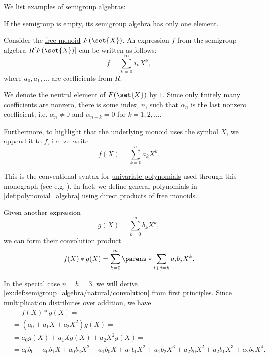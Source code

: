 \begin{example}\label{ex:def:semigroup_algebra}
  We list examples of \hyperref[def:semigroup_algebra]{semigroup algebras}:
  \begin{thmenum}
     If the semigroup is empty, its semigroup algebra has only one element.

     Consider the \hyperref[def:free_monoid]{free monoid} \( F(\set{ X }) \). An expression \( f \) from the semigroup algebra \( R[F(\set{ X })] \) can be written as follows:
    \begin{equation*}
      f = \sum_{k=0}^\infty a_k X^k,
    \end{equation*}
    where \( a_0, a_1, \ldots \) are coefficients from \( R \).

    We denote the neutral element of \( F(\set{ X }) \) by \( 1 \). Since only finitely many coefficients are nonzero, there is some index, \( n \), such that \( \alpha_n \) is the last nonzero coefficient; i.e. \( \alpha_n \neq 0 \) and \( \alpha_{n+k} = 0 \) for \( k = 1, 2, \ldots \).

    Furthermore, to highlight that the underlying monoid uses the symbol \( X \), we append it to \( f \), i.e. we write
    \begin{equation*}
      f(X) = \sum_{k=0}^n a_k X^k.
    \end{equation*}

    This is the conventional syntax for \hyperref[def:univariate_polynomial]{univariate polynomials} used through this monograph (see e.g. ). In fact, we define general polynomials in \cref{def:polynomial_algebra} using direct products of free monoids.

    Given another expression
    \begin{equation*}
      g(X) = \sum_{k=0}^m b_k X^k,
    \end{equation*}
    we can form their convolution product
    \begin{equation}\label{ex:def:semigroup_algebra/natural/convolution}
      f(X) \ast g(X) = \sum_{k=0}^m \parens*{ \sum_{i+j=k} a_i b_j } X^k.
    \end{equation}

    In the special case \( n = h = 3 \), we will derive \eqref{ex:def:semigroup_algebra/natural/convolution} from first principles. Since multiplication distributes over addition, we have
    \small
    \begin{align*}
      &\phantom{{}={}}
      f(X) \ast g(X)
      = \\ &=
      (a_0 + a_1 X + a_2 X^2) g(X)
      = \\ &=
      a_0 g(X) + a_1 X g(X) + a_2 X^2 g(X)
      = \\ &=
      a_0 b_0 + a_0 b_1 X + a_0 b_2 X^2 + a_1 b_0 X + a_1 b_1 X^2 + a_1 b_2 X^3 + a_2 b_0 X^2 + a_2 b_1 X^3 + a_2 b_2 X^4.
    \end{align*}
    \normalsize


\end{thmenum}
\end{example}
